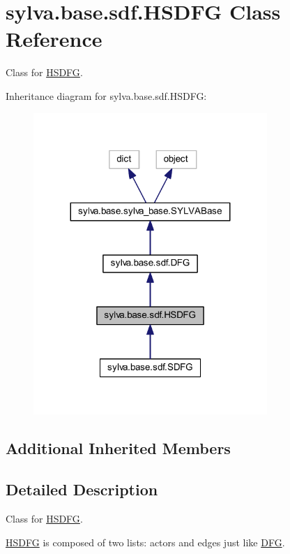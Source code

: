\hypertarget{classsylva_1_1base_1_1sdf_1_1_h_s_d_f_g}{}\section{sylva.\+base.\+sdf.\+H\+S\+D\+FG Class Reference}
\label{classsylva_1_1base_1_1sdf_1_1_h_s_d_f_g}


Class for \hyperlink{classsylva_1_1base_1_1sdf_1_1_h_s_d_f_g}{H\+S\+D\+FG}.  




Inheritance diagram for sylva.\+base.\+sdf.\+H\+S\+D\+FG\+:\nopagebreak
\begin{figure}[H]
\begin{center}
\leavevmode
\includegraphics[width=251pt]{classsylva_1_1base_1_1sdf_1_1_h_s_d_f_g__inherit__graph}
\end{center}
\end{figure}
\subsection*{Additional Inherited Members}


\subsection{Detailed Description}
Class for \hyperlink{classsylva_1_1base_1_1sdf_1_1_h_s_d_f_g}{H\+S\+D\+FG}. 

\hyperlink{classsylva_1_1base_1_1sdf_1_1_h_s_d_f_g}{H\+S\+D\+FG} is composed of two lists\+: actors and edges just like \hyperlink{classsylva_1_1base_1_1sdf_1_1_d_f_g}{D\+FG}.


